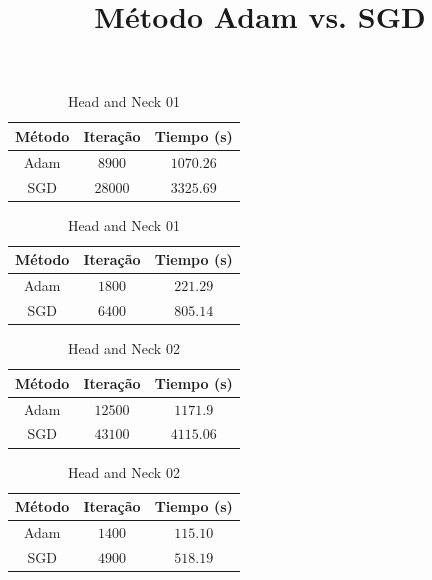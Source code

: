 \documentclass[a4paper,12pt]{article}
\title{Método Adam vs. SGD}
\author{}
\date{}
\begin{document}
\maketitle %

\vspace{-2cm}
\begin{table}[!ht]
    \centering
    \caption{Head and Neck 01}
    \begin{minipage}[t]{0.45\textwidth}
        \centering
        \label{tab:tab1}
        \begin{tabular}{ccc}
            \hline
            Método & Iteração & Tiempo (s)\\
            \hline
            Adam & $8900$ &  $1070.26$ \\
            SGD & $28000$ & $3325.69$ \\
            \hline
        \end{tabular}
    \end{minipage}
    \hfill
    \begin{minipage}[t]{0.45\textwidth}
        \centering
        \label{tab:tab2}
        \begin{tabular}{ccc}
            \hline
            Método & Iteração & Tiempo (s) \\
            \hline
            Adam & $1800$ &   $221.29$  \\
            SGD & $6400$ & $805.14$ \\
            \hline
        \end{tabular}
    \end{minipage}
\end{table}

\vspace{-0.5cm}
\begin{table}[!ht]
    \centering
    \caption{Head and Neck 02}
    \begin{minipage}[t]{0.45\textwidth}
        \centering
        \label{tab:tab1}
        \begin{tabular}{ccc}
            \hline
            Método & Iteração & Tiempo (s)\\
            \hline
            Adam & $12500$ &  $1171.9$ \\
            SGD & $43100$ & $4115.06$ \\
            \hline
        \end{tabular}
    \end{minipage}
    \hfill
    \begin{minipage}[t]{0.45\textwidth}
        \centering
        \label{tab:tab2}
        \begin{tabular}{ccc}
            \hline
            Método & Iteração & Tiempo (s) \\
            \hline
            Adam & $1400$ &   $115.10$  \\
            SGD & $4900$ & $518.19$ \\
            \hline
        \end{tabular}
    \end{minipage}
\end{table}
\end{document}
